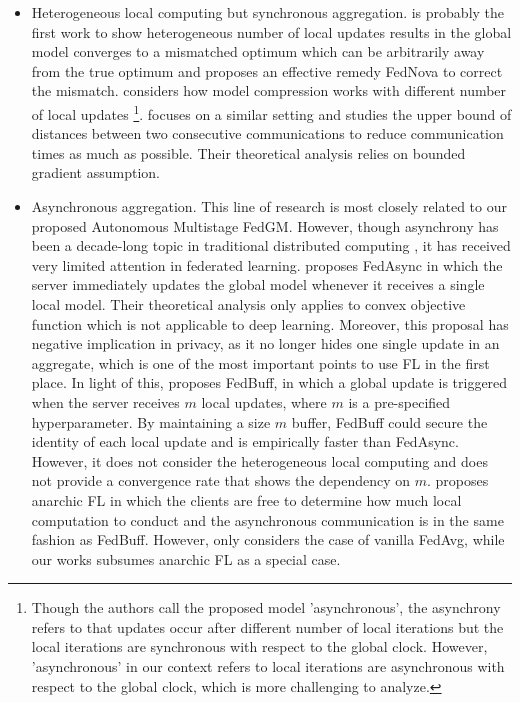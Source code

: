 \begin{itemize}[leftmargin=*]
    \item Heterogeneous local computing but synchronous aggregation. \cite{Wang20FedNova} is probably the first work to show heterogeneous number of local updates results in the global model converges to a mismatched optimum which can be arbitrarily away from the true optimum and proposes an effective remedy FedNova to correct the mismatch. \cite{Basu19Qsparse-Local-SGD} considers how model compression works with different number of local updates \footnote{Though the authors call the proposed model 'asynchronous', the asynchrony refers to that updates occur after different number of local iterations but the local iterations are synchronous with respect to the global clock. However, 'asynchronous' in our context refers to local iterations are asynchronous with respect to the global clock, which is more challenging to analyze.}. \cite{Avdiukhin21arbitrarycommunication} focuses on a similar setting and studies the upper bound of distances between two consecutive communications to reduce communication times as much as possible. Their theoretical analysis relies on bounded gradient assumption.
    \item Asynchronous aggregation. This line of research is most closely related to our proposed Autonomous Multistage FedGM. However, though asynchrony has been a decade-long topic in traditional distributed computing \citep{Zhang2014DeepElasticAvg,Lian15Asynchronous,Zheng17ASGD}, it has received very limited attention in federated learning. \cite{Xie2019AsynchronousFO} proposes FedAsync in which the server immediately updates the global model whenever it receives a single local model. Their theoretical analysis only applies to convex objective function which is not applicable to deep learning. Moreover, this proposal has negative implication in privacy, as it no longer hides one single update in an aggregate, which is one of the most important points to use FL in the first place. In light of this, \cite{Nguyen2021FedBuff} proposes FedBuff, in which a global update is triggered when the server receives $m$ local updates, where $m$ is a pre-specified hyperparameter. By maintaining a size $m$ buffer, FedBuff could secure the identity of each local update and is empirically faster than FedAsync. However, it does not consider the heterogeneous local computing and does not provide a convergence rate that shows the dependency on $m$. \cite{Yang2021AnarchicFL} proposes anarchic FL in which the clients are free to determine how much local computation to conduct and the asynchronous communication is in the same fashion as FedBuff. However, \cite{Yang2021AnarchicFL} only considers the case of vanilla FedAvg, while our works subsumes anarchic FL as a special case.
\end{itemize}

